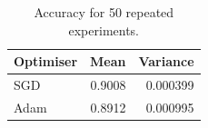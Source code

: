 \documentclass[twocolumn]{article}
\begin{document}
\begin{table}
    \centering
    \caption{Accuracy for 50 repeated experiments.}
    \label{tab:acc}
    \begin{tabular}{lrr}
    \toprule
    Optimiser &    Mean &  Variance \\
    \midrule
    SGD  &  0.9008 &  0.000399 \\
    Adam &  0.8912 &  0.000995 \\
    \bottomrule
    \end{tabular}
\end{table}
\end{document}

